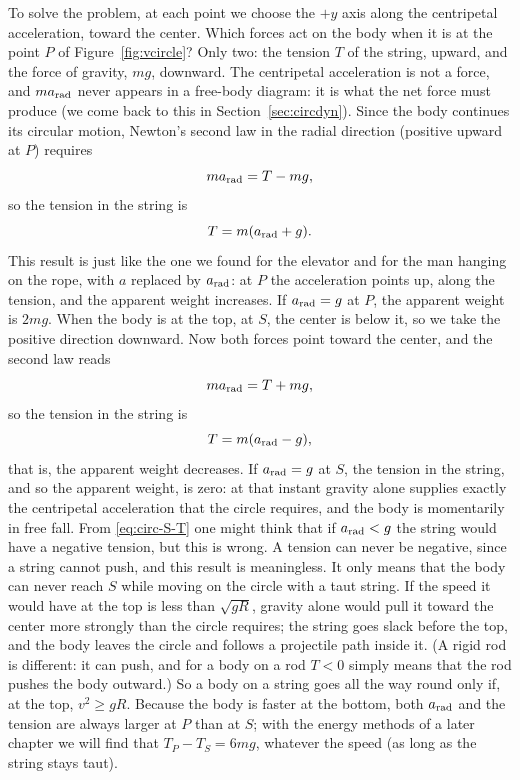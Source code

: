 \documentclass[11pt,a4paper]{article}
\begin{document}
To solve the problem, at each point we choose the $+y$ axis along the centripetal acceleration,
toward the center. Which forces act on the body when it is at the point $P$ of
Figure~\ref{fig:vcircle}? Only two: the tension $T$ of the string, upward, and the force of gravity,
$mg$, downward. The centripetal acceleration is not a force, and $m a_{\mathrm{rad}}$ never appears in a
free-body diagram: it is what the net force must produce (we come back to this in
Section~\ref{sec:circdyn}). Since the body continues its circular motion, Newton's second law in the
radial direction (positive upward at $P$) requires
\begin{equation}\label{eq:circ-P}
  m a_{\mathrm{rad}} = T - mg ,
\end{equation}
so the tension in the string is
\begin{equation}\label{eq:circ-P-T}
  T = m(a_{\mathrm{rad}} + g) .
\end{equation}
This result is just like the one we found for the elevator and for the man hanging on the rope, with
$a$ replaced by $a_{\mathrm{rad}}$: at $P$ the acceleration points up, along the tension, and the apparent
weight increases. If $a_{\mathrm{rad}} = g$ at $P$, the apparent weight is $2mg$. When the body is at the
top, at $S$, the center is below it, so we take the positive direction downward. Now both forces
point toward the center, and the second law reads
\begin{equation}\label{eq:circ-S}
  m a_{\mathrm{rad}} = T + mg ,
\end{equation}
so the tension in the string is
\begin{equation}\label{eq:circ-S-T}
  T = m(a_{\mathrm{rad}} - g) ,
\end{equation}
that is, the apparent weight decreases. If $a_{\mathrm{rad}} = g$ at $S$, the tension in the string, and so
the apparent weight, is zero: at that instant gravity alone supplies exactly the centripetal
acceleration that the circle requires, and the body is momentarily in free fall. From
\eqref{eq:circ-S-T} one might think that if $a_{\mathrm{rad}} < g$ the string would have a negative tension,
but this is wrong. A tension can never be negative, since a string cannot push, and this result is
meaningless. It only means that the body can never reach $S$ while moving on the circle with a taut
string. If the speed it would have at the top is less than $\sqrt{gR}$, gravity alone would pull it
toward the center more strongly than the circle requires; the string goes slack before the top, and the body
leaves the circle and follows a projectile path inside it. (A rigid rod is different: it can push,
and for a body on a rod $T < 0$ simply means that the rod pushes the body outward.) So a body on a
string goes all the way round only if, at the top, $v^2 \geq gR$. Because the body is faster at the
bottom, both $a_{\mathrm{rad}}$ and the tension are always larger at $P$ than at $S$; with the energy
methods of a later chapter we will find that $T_P - T_S = 6mg$, whatever the speed (as long as the
string stays taut).
\end{document}
